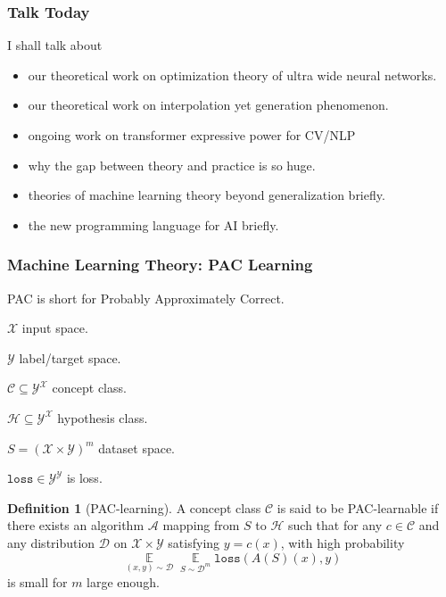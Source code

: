 \documentclass{beamer}   	%
\theoremstyle{definition}
\newtheorem*{defn}{Definition}
\newcommand{\rust}[1]{\texttt{#1}}
\newcommand{\expect}{\mathop{\mathbb{E}}}
\begin{document}
\begin{frame}
\frametitle{Talk Today}
I shall talk about
\begin{itemize}
	\item our theoretical work on optimization theory of ultra wide neural networks.
	\item our theoretical work on interpolation yet generation phenomenon.
	\item ongoing work on transformer expressive power for CV/NLP
	\item why the gap between theory and practice is so huge.
	\item theories of machine learning theory beyond generalization briefly.
	\item the new programming language for AI briefly.
\end{itemize}
\end{frame}

\begin{frame}
\frametitle{Machine Learning Theory: PAC Learning}

PAC is short for Probably Approximately Correct.

$\mathcal{X}$ input space.

$\mathcal{Y}$ label/target space.

$\mathcal{C}\subseteq \mathcal{Y}^\mathcal{X}$ concept class.

$\mathcal{H}\subseteq \mathcal{Y}^\mathcal{X}$ hypothesis class.

$S=(\mathcal{X}\times \mathcal{Y})^m$ dataset space.

$\rust{loss}\in \mathcal{Y}^\mathcal{Y}$ is loss.

\begin{defn}[PAC-learning]
A concept class $\mathcal{C}$ is said to be PAC-learnable if there exists an algorithm $\mathcal{A}$ mapping from $S$ to $\mathcal{H}$ such that for any $c\in \mathcal{C}$ and any distribution $\mathcal{D}$ on $\mathcal{X}\times\mathcal{Y}$ satisfying $y=c(x)$, with high probability
\begin{equation}
	\expect\limits_{(x,y)\sim \mathcal{D}}\expect\limits_{S\sim \mathcal{D}^m}\rust{loss}(A(S)(x),y)
\end{equation}
is small for $m$ large enough.
\end{defn}

\end{frame}
\end{document}
